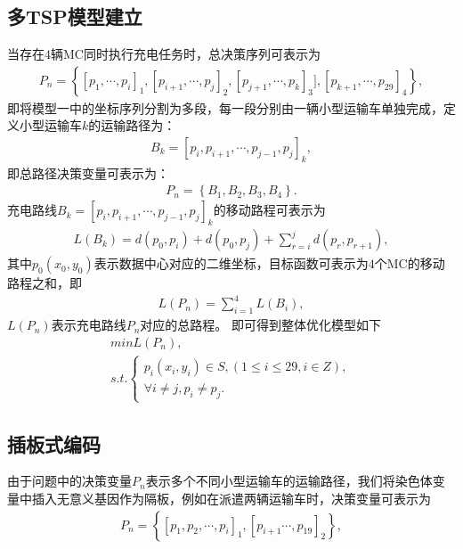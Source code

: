 \documentclass{whutmod}
\begin{document}
      \subsection{多TSP模型建立}
      当存在$4$辆MC同时执行充电任务时，总决策序列可表示为
      \begin{gather*}
      P_n=\left \{[p_{1},\cdots,p_{i}]_1,[p_{i+1},\cdots,p_{j}]_2,[p_{j+1},\cdots, p_{k}]_{3}],[p_{k+1},\cdots,p_{29}]_4\right \},
      \end{gather*}
      即将模型一中的坐标序列分割为多段，每一段分别由一辆小型运输车单独完成，定义小型运输车$k$的运输路径为：
      \begin{gather*}
      B_k=[p_{i},p_{i+1},\cdots,p_{j-1},p_{j}]_k,
      \end{gather*}
      即总路径决策变量可表示为：
      \begin{gather*}
      P_n=\left \{B_1,B_2,B_3,B_4\right \}.
      \end{gather*}
      充电路线$B_k=[p_{i},p_{i+1},\cdots,p_{j-1},p_{j}]_k$的移动路程可表示为
      \begin{gather*}
     L(B_k)=d(p_0,p_{i})+d(p_0,p_{j})+\sum_{r=i}^{j}d(p_r,p_{r+1}) ,
      \end{gather*}
      其中$p_0(x_0,y_0)$表示数据中心对应的二维坐标，目标函数可表示为$4$个MC的移动路程之和，即
       \begin{gather}
      L(P_n)=\sum_{i=1}^{4}L(B_i),
      \end{gather}
      $L(P_n)$表示充电路线$P_n$对应的总路程。 即可得到整体优化模型如下 
      \begin{gather}
      min L(P_n) ,\\
      s.t.\left\{\begin{matrix}p_{i}(x_i,y_i)\in S,(1\leqslant i \leqslant 29 ,i\in Z),
      \\ \forall i \neq j,p_i \neq p_j .
      \end{matrix}\right.
      \end{gather}
      
     
      \subsection{插板式编码}

      由于问题中的决策变量$P_n$表示多个不同小型运输车的运输路径，我们将染色体变量中插入无意义基因作为隔板，例如在派遣两辆运输车时，决策变量可表示为
      \begin{gather*}
      P_n=\left \{[p_{1},p_{2},\cdots,p_{i}]_1,[p_{i+1}\cdots,p_{19}]_{2}\right \},
      \end{gather*}
      
\end{document}
